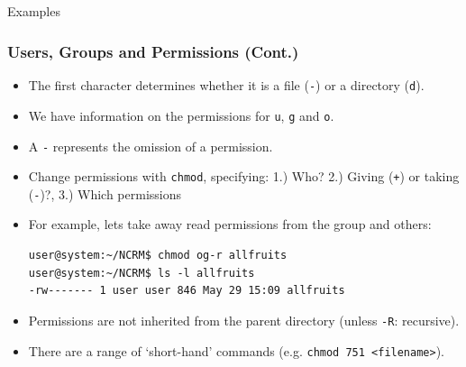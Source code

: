 \documentclass[10pt]{beamer}
\begin{document}
\subsection{}
\begin{frame}[fragile]{Examples}
\frametitle{Users, Groups and Permissions (Cont.)}
\begin{itemize}
\item The first character determines whether it is a file (\texttt{-}) or a directory (\texttt{d}).\vspace{0.05in}
\item We have information on the permissions for \texttt{u}, \texttt{g} and \texttt{o}.\vspace{0.05in}
\item A \texttt{-} represents the omission of a permission.\vspace{0.05in}
\item Change permissions with \texttt{chmod}, specifying: 1.) Who? 2.) Giving (\texttt{+}) or taking (\texttt{-})?, 3.) Which permissions\vspace{0.05in}
\item For example, lets take away read permissions from the group and others:
\begin{lstlisting}[style=BashInputStyle, title=The \texttt{chmod} Command]
user@system:~/NCRM$ chmod og-r allfruits
user@system:~/NCRM$ ls -l allfruits
-rw------- 1 user user 846 May 29 15:09 allfruits
\end{lstlisting}\vspace{0.05in}
\item Permissions are not inherited from the parent directory (unless \texttt{-R}: recursive).\vspace{0.05in}
\item There are a range of `short-hand' commands (e.g. \texttt{chmod 751 <filename>}).
\end{itemize}
\end{frame}
\end{document}
